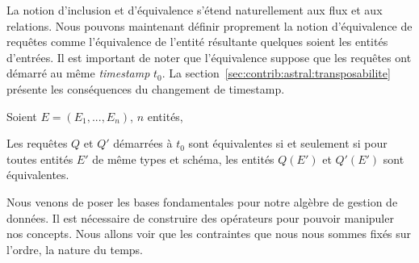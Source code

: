La notion d'inclusion et d'équivalence s'étend naturellement aux flux et aux relations. Nous pouvons maintenant définir proprement la notion d'équivalence de requêtes comme l'équivalence de l'entité résultante quelques soient les entités d'entrées. Il est important de noter que l'équivalence suppose que les requêtes ont démarré au même \textit{timestamp} $t_0$. La section~\ref{sec:contrib:astral:transposabilite} présente les conséquences du changement de timestamp.
\begin{defi}\label{def:equivalence}
	Soient $E=(E_1, ..., E_n)$, $n$ entités,
	
	Les requêtes $Q$ et $Q'$ démarrées à $t_0$ sont équivalentes si et seulement si pour toutes entités $E'$ de même types et schéma, les entités $Q(E')$ et $Q'(E')$ sont équivalentes.
\end{defi}

Nous venons de poser les bases fondamentales pour notre algèbre de gestion de données. Il est nécessaire de construire des opérateurs pour pouvoir manipuler nos concepts. Nous allons voir que les contraintes que nous nous sommes fixés sur l'ordre, la nature du temps.
